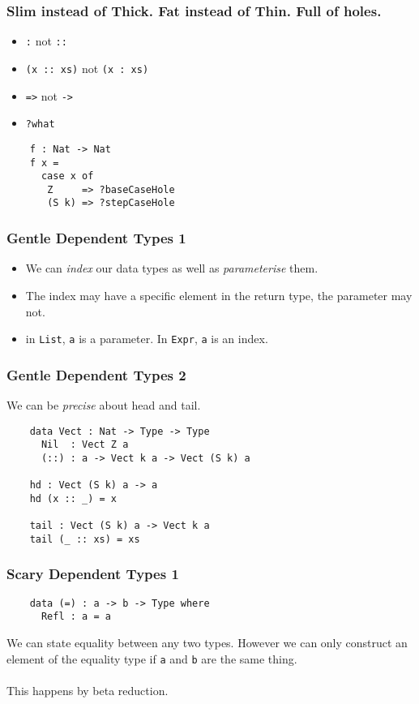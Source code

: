 \documentclass[hyperref={colorlinks = true,linkcolor = blue, citecolor = blue, urlcolor = blue}]{beamer}
\begin{document}
\begin{frame}[fragile]
  \frametitle{Slim instead of Thick. Fat instead of Thin. Full of holes.}
  \begin{itemize}
    \item \texttt{:} not \texttt{::}
    \item \texttt{(x :: xs)} not \texttt{(x : xs)}
    \item \texttt{=>} not \texttt{->}
    \item \texttt{?what}
  \end{itemize}
  \begin{verbatim}
    f : Nat -> Nat
    f x =
      case x of
       Z     => ?baseCaseHole
       (S k) => ?stepCaseHole
  \end{verbatim}
\end{frame}

\begin{frame}[fragile]
  \frametitle{Gentle Dependent Types 1}
  \begin{itemize}
    \item We can \emph{index} our data types as well as \emph{parameterise} them.
    \item The index may have a specific element in the return type, the parameter may not.
    \item in \texttt{List}, \texttt{a} is a parameter. In 
             \texttt{Expr}, \texttt{a} is an index.
  \end{itemize}
\end{frame}

\begin{frame}[fragile]
  \frametitle{Gentle Dependent Types 2}
  We can be \emph{precise} about head and tail.
  \begin{verbatim}
    data Vect : Nat -> Type -> Type
      Nil  : Vect Z a
      (::) : a -> Vect k a -> Vect (S k) a

    hd : Vect (S k) a -> a      
    hd (x :: _) = x      
      
    tail : Vect (S k) a -> Vect k a      
    tail (_ :: xs) = xs    
  \end{verbatim}
\end{frame}

\begin{frame}[fragile]
  \frametitle{Scary Dependent Types 1}
  \begin{verbatim}
    data (=) : a -> b -> Type where
      Refl : a = a
  \end{verbatim}
  We can state equality between any two types. However we can only construct
  an element of the equality type if \texttt{a} and \texttt{b}
  are the same thing. \\ \\
  This happens by beta reduction.
\end{frame}
\end{document}
